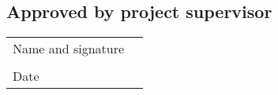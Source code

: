 \documentclass[12pt]{article}
\begin{document}
\vspace{1em }
\subsection*{Approved by project supervisor}

\begin{tabular}{l p{8cm}}
\\ Name and signature &  \dotfill \\
\\ Date & \dotfill \\
\end{tabular}
\end{document}
